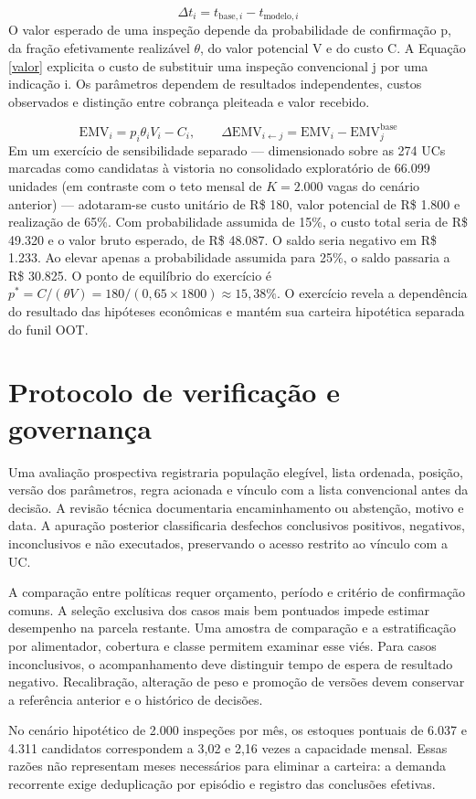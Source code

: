 \begin{equation}\label{tempo}
\Delta t_i=t_{\mathrm{base},i}-t_{\mathrm{modelo},i}
\end{equation}
O valor esperado de uma inspeção depende da probabilidade de confirmação p, da fração efetivamente realizável \ensuremath{\theta}, do valor potencial V e do custo C. A Equação \eqref{valor} explicita o custo de substituir uma inspeção convencional j por uma indicação i. Os parâmetros dependem de resultados independentes, custos observados e distinção entre cobrança pleiteada e valor recebido.

\begin{equation}\label{valor}
\mathrm{EMV}_i=p_i\theta_iV_i-C_i,\qquad \Delta\mathrm{EMV}_{i\leftarrow j}=\mathrm{EMV}_i-\mathrm{EMV}^{\mathrm{base}}_j
\end{equation}
Em um exercício de sensibilidade separado — dimensionado sobre as 274 UCs marcadas como candidatas à vistoria no consolidado exploratório de 66.099 unidades (em contraste com o teto mensal de $K=2.000$ vagas do cenário anterior) — adotaram-se custo unitário de R\$ 180, valor potencial de R\$ 1.800 e realização de 65\%. Com probabilidade assumida de 15\%, o custo total seria de R\$ 49.320 e o valor bruto esperado, de R\$ 48.087. O saldo seria negativo em R\$ 1.233. Ao elevar apenas a probabilidade assumida para 25\%, o saldo passaria a R\$ 30.825. O ponto de equilíbrio do exercício é $p^*=C/(\theta V)=180/(0{,}65\times 1800)\approx 15{,}38\%$. O exercício revela a dependência do resultado das hipóteses econômicas e mantém sua carteira hipotética separada do funil OOT.

\section{Protocolo de verificação e governança}
Uma avaliação prospectiva registraria população elegível, lista ordenada, posição, versão dos parâmetros, regra acionada e vínculo com a lista convencional antes da decisão. A revisão técnica documentaria encaminhamento ou abstenção, motivo e data. A apuração posterior classificaria desfechos conclusivos positivos, negativos, inconclusivos e não executados, preservando o acesso restrito ao vínculo com a UC.

A comparação entre políticas requer orçamento, período e critério de confirmação comuns. A seleção exclusiva dos casos mais bem pontuados impede estimar desempenho na parcela restante. Uma amostra de comparação e a estratificação por alimentador, cobertura e classe permitem examinar esse viés. Para casos inconclusivos, o acompanhamento deve distinguir tempo de espera de resultado negativo. Recalibração, alteração de peso e promoção de versões devem conservar a referência anterior e o histórico de decisões.


No cenário hipotético de 2.000 inspeções por mês, os estoques pontuais de 6.037 e 4.311 candidatos correspondem a 3,02 e 2,16 vezes a capacidade mensal. Essas razões não representam meses necessários para eliminar a carteira: a demanda recorrente exige deduplicação por episódio e registro das conclusões efetivas.
